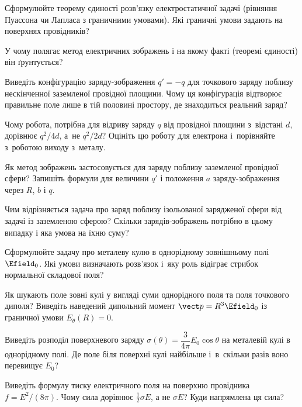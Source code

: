 \begin{Questions}
\begin{quizlist}
        \item Сформулюйте теорему єдиності розв'язку електростатичної задачі (рівняння Пуассона чи Лапласа з граничними умовами). Які граничні умови задають на поверхнях провідників?
        \item У чому полягає метод електричних зображень і на якому факті (теоремі єдиності) він ґрунтується?
        \item Виведіть конфігурацію заряду-зображення $q'=-q$ для точкового заряду поблизу нескінченної заземленої провідної площини. Чому ця конфігурація відтворює правильне поле лише в тій половині простору, де знаходиться реальний заряд?
        \item Чому робота, потрібна для відриву заряду $q$ від провідної площини з~відстані $d$, дорівнює $q^2/4d$, а~не $q^2/2d$? Оцініть цю роботу для електрона і~порівняйте з~роботою виходу з~металу.
        \item Як метод зображень застосовується для заряду поблизу заземленої провідної сфери? Запишіть формули для величини $q'$ і положення $a$ заряду-зображення через $R$, $b$ і $q$.
        \item Чим відрізняється задача про заряд поблизу ізольованої зарядженої сфери від задачі із заземленою сферою? Скільки зарядів-зображень потрібно в цьому випадку і яка умова на їхню суму?
        \item Сформулюйте задачу про металеву кулю в однорідному зовнішньому полі $\Efield_0$. Які умови визначають розв'язок і~яку роль відіграє стрибок нормальної складової поля?
        \item Як шукають поле зовні кулі у вигляді суми однорідного поля та поля точкового диполя? Виведіть наведений дипольний момент $\vect p = R^3\Efield_0$ із граничної умови $E_\theta(R)=0$.
        \item Виведіть розподіл поверхневого заряду $\sigma(\theta) = \dfrac{3}{4\pi}E_0\cos\theta$ на металевій кулі в однорідному полі. Де поле біля поверхні кулі найбільше і~в~скільки разів воно перевищує $E_0$?
        \item Виведіть формулу тиску електричного поля на поверхню провідника $f = E^2/(8\pi)$. Чому сила дорівнює $\frac12\sigma E$, а не $\sigma E$? Куди напрямлена ця сила?
    \end{quizlist}
\end{Questions}

